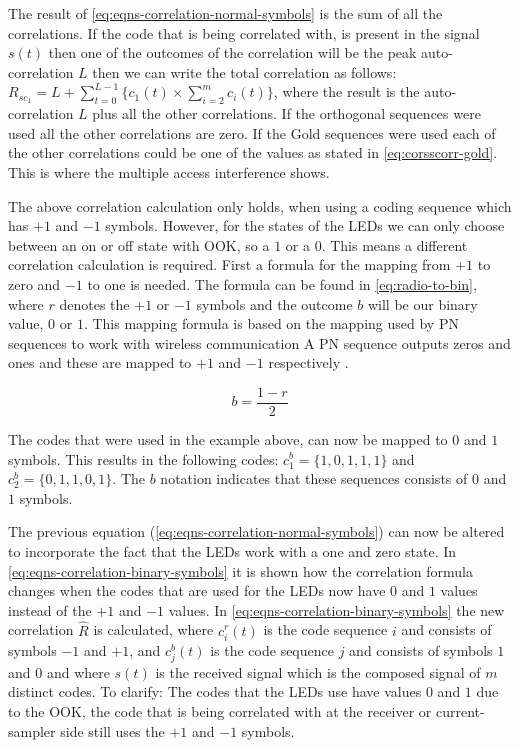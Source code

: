 The result of \autoref{eq:eqns-correlation-normal-symbols} is the sum of all the correlations. 
If the code that is being correlated with, is present in the signal $s(t)$ then one of the outcomes of the correlation will be the peak auto-correlation $L$ then we can write the total correlation as follows: $R_{sc_{1}} = L + \displaystyle\sum_{t = 0} ^ {L - 1} \Bigg\{ c_1(t) \times  \displaystyle\sum_{i = 2} ^ {m} c_i(t) \Bigg\} $, where the result is the auto-correlation $L$ plus all the other correlations.
If the orthogonal sequences were used all the other correlations are zero.
If the Gold sequences were used each of the other correlations could be one of the values as stated in \autoref{eq:corsscorr-gold}.
This is where the multiple access interference shows.







The above correlation calculation only holds, when using a coding sequence which has $+1$ and $-1$ symbols.
However, for the states of the LEDs we can only choose between an on or off state with OOK, so a $1$ or a $0$.
This means a different correlation calculation is required.
First a formula for the mapping from $+1$ to zero and $-1$ to one is needed.
The formula can be found in \autoref{eq:radio-to-bin}, where $r$ denotes the $+1$ or $-1$ symbols and the outcome $b$ will be our binary value, $0$ or $1$.
This mapping formula is based on the mapping used by PN sequences to work with wireless communication
A PN sequence outputs zeros and ones and these are mapped to $+1$ and $-1$ respectively \cite{cdma-mapping-symbols-ref}.
 
\begin{equation}
	b = \frac{1 - r}{2}
	\label{eq:radio-to-bin}
\end{equation}


The codes that were used in the example above, can now be mapped to $0$ and $1$ symbols.
This results in the following codes: $c^b_1 = \{ 1, 0, 1, 1, 1 \}$ and $c^b_2 = \{ 0, 1, 1, 0, 1 \}$.
The $b$ notation indicates that these sequences consists of $0$ and $1$ symbols.



The previous equation (\autoref{eq:eqns-correlation-normal-symbols}) can now be altered to incorporate the fact that the LEDs work with a one and zero state.
In \autoref{eq:eqns-correlation-binary-symbols} it is shown how the correlation formula changes when the codes that are used for the LEDs now have $0$ and $1$ values instead of the $+1$ and $-1$ values.
In \autoref{eq:eqns-correlation-binary-symbols} the new correlation $\hat{R}$ is calculated, where $c^r_i(t)$ is the code sequence $i$ and consists of symbols $-1$ and $+1$, and $c^b_j(t)$ is the code sequence $j$ and consists of symbols $1$ and $0$ and where $s(t)$ is the received signal which is the composed signal of $m$ distinct codes.
To clarify: The codes that the LEDs use have values $0$ and $1$ due to the OOK, the code that is being correlated with at the receiver or current-sampler side still uses the $+1$ and $-1$ symbols.








